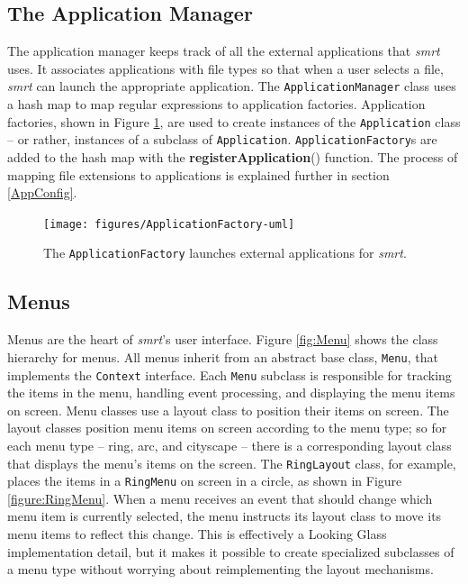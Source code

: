 \documentclass[letterpaper, titlepage, 11pt]{article}
\begin{document}
\subsection{The Application Manager}
The application manager keeps track of all the external applications that
\textit{smrt} uses. It associates applications with file types so that when a
user selects a file, \textit{smrt} can launch the appropriate application. The
\texttt{ApplicationManager} class uses a hash map to map regular expressions to
application factories. Application factories, shown in Figure
\ref{fig:ApplicationFactory}, are used to create instances of the
\texttt{Application} class -- or rather, instances of a subclass of
\texttt{Application}. \texttt{ApplicationFactory}s are added to the hash map
with the \textbf{registerApplication}() function. The process of mapping file
extensions to applications is explained further in section \ref{AppConfig}.

\begin{figure}[htb]
\centering
\texttt{[image: figures/ApplicationFactory-uml]}
\caption{The \texttt{ApplicationFactory} launches external applications for
\textit{smrt}.\label{fig:ApplicationFactory}}
\end{figure}

\subsection{Menus}
Menus are the heart of \textit{smrt}'s user interface. Figure \ref{fig:Menu}
shows the class hierarchy for menus. All menus inherit from an abstract base
class, \texttt{Menu}, that implements the \texttt{Context} interface.  Each
\texttt{Menu} subclass is responsible for tracking the items in the menu,
handling event processing, and displaying the menu items on screen. Menu
classes use a layout class to position their items on screen. The layout
classes position menu items on screen according to the menu type; so for each
menu type -- ring, arc, and cityscape -- there is a corresponding layout class
that displays the menu's items on the screen. The \texttt{RingLayout} class,
for example, places the items in a \texttt{RingMenu} on screen in a circle, as
shown in Figure \ref{figure:RingMenu}. When a menu receives an event that
should change which menu item is currently selected, the menu instructs its
layout class to move its menu items to reflect this change.  This is
effectively a Looking Glass implementation detail, but it makes it possible
to create specialized subclasses of a menu type without worrying about
reimplementing the layout mechanisms.
\end{document}
